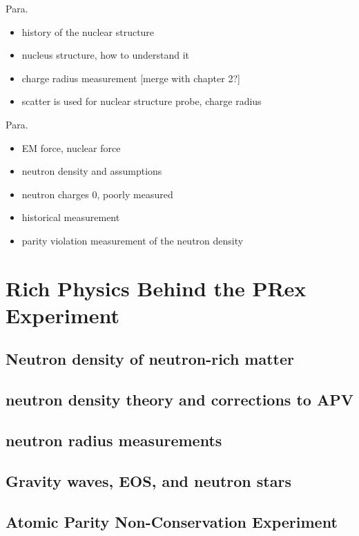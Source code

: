 Para.

\begin{itemize}
\item history of the nuclear structure
    \item nucleus structure, how to understand it
    \item charge radius measurement [merge with chapter 2?]
    \item scatter is used for nuclear structure probe, charge radius 
\end{itemize}


Para. 

\begin{itemize}
    \item EM force, nuclear force
    \item neutron density and assumptions
\end{itemize}


\begin{itemize}
    \item neutron charges 0, poorly measured
    \item historical measurement 
    \item parity violation measurement of the neutron density
\end{itemize} 

\section{Rich Physics Behind the PRex Experiment}
\subsection{Neutron density of neutron-rich matter}
\subsection{neutron density theory and corrections to APV}
\subsection{neutron radius measurements}
\subsection{Gravity waves, EOS, and neutron stars}
\subsection{Atomic Parity Non-Conservation Experiment}

